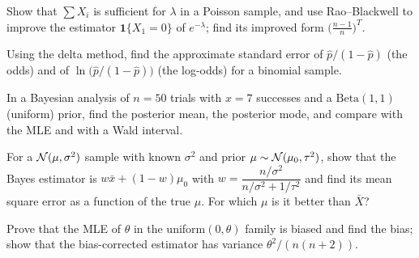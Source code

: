 \begin{exercise}
Show that $\sum X_i$ is sufficient for $\lambda$ in a Poisson sample, and use Rao--Blackwell to improve the estimator $\mathbf{1}\{X_1=0\}$ of $e^{-\lambda}$; find its improved form $\big(\frac{n-1}n\big)^{T}$.
\end{exercise}

\begin{exercise}
Using the delta method, find the approximate standard error of $\hat{p}/(1-\hat{p})$ (the odds) and of $\ln\big(\hat{p}/(1-\hat{p})\big)$ (the log-odds) for a binomial sample.
\end{exercise}

\begin{exercise}
In a Bayesian analysis of $n=50$ trials with $x=7$ successes and a $\mathrm{Beta}(1,1)$ (uniform) prior, find the posterior mean, the posterior mode, and compare with the MLE and with a Wald interval.
\end{exercise}

\begin{exercise}
For a $\mathcal{N}(\mu,\sigma^2)$ sample with known $\sigma^2$ and prior $\mu\sim\mathcal{N}(\mu_0,\tau^2)$, show that the Bayes estimator is $w\bar{x}+(1-w)\mu_0$ with $w=\dfrac{n/\sigma^2}{n/\sigma^2+1/\tau^2}$ and find its mean square error as a function of the true $\mu$. For which $\mu$ is it better than $\bar{X}$?
\end{exercise}

\begin{exercise}
Prove that the MLE of $\theta$ in the uniform$(0,\theta)$ family is biased and find the bias; show that the bias-corrected estimator has variance $\theta^2/(n(n+2))$.
\end{exercise}
